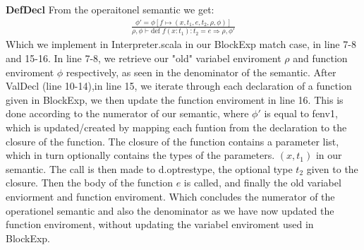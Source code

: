 \documentclass[a4paper, 10pt]{article}
\theoremstyle{remark}
\begin{document}
	\noindent\textbf{DefDecl}
	From the operaitonel semantic we get: 
	\begin{align*}
	\frac{\phi'=\phi [f \mapsto(x,t_1,e,t_2,\rho,\phi)]}{\rho,\phi \vdash \text{def } f(x:t_1):t_2=e \Rightarrow \rho,\phi'}
	\end{align*}
	Which we implement in Interpreter.scala in our BlockExp match case, in line 7-8 and 15-16.
	In line 7-8, we retrieve our "old" variabel enviroment $\rho$ and function enviroment $\phi$ respectively, as seen in the denominator of the semantic. After ValDecl (line 10-14),in line 15, we iterate through each declaration of a function given in BlockExp, we then update the function enviroment in line 16. This is done according to the numerator of our semantic, where $\phi'$ is equal to fenv1, which is updated/created by mapping each funtion from the declaration to the closure of the function. The closure of the function contains a parameter list, which in turn optionally contains the types of the parameters. $(x,t_1)$ in our semantic. The call is then made to d.optrestype, the optional type $t_2$ given to the closure. Then the body of the function $e$ is called, and finally the old variabel enviorment and function enviroment. Which concludes the numerator of the operationel semantic and also the denominator as we have now updated the function enviroment, without updating the variabel enviroment used in BlockExp.   \\ 
	
\end{document}
